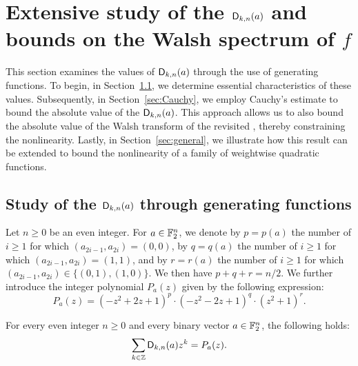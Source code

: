 \documentclass[11pt]{llncs}
\begin{document}
\section{Extensive study of the $\Dnka nka$ and bounds on the Walsh spectrum of $f$}\label{sec:dnk}

This section examines the values of $\Dnka nka$ through the use of generating functions. To begin, in Section~\ref{sec:genfunc}, we determine essential characteristics of these values. Subsequently, in Section~\ref{sec:Cauchy}, we employ Cauchy's estimate to bound the absolute value of the $\Dnka nka$. This approach allows us to also bound the absolute value of the Walsh transform of the revisited \hwbf{}, thereby constraining the nonlinearity. Lastly, in Section~\ref{sec:general}, we illustrate how this result can be extended to bound the nonlinearity of a family of weightwise quadratic functions.

\subsection{Study of the $\Dnka nka$ through generating functions}\label{sec:genfunc}

\begin{definition}\label{defi:P_a}
    Let $n\geq 0$ be an even integer. For $a\in\F_2^n$, we denote by $p=p(a)$ the number of $i\geq 1$ for which $(a_{2i-1},a_{2i})=(0,0)$, by $q=q(a)$ the number of $i\geq 1$ for which $(a_{2i-1},a_{2i})=(1,1)$, and by $r=r(a)$ the number of $i\geq 1$ for which $(a_{2i-1},a_{2i})\in\{(0,1),(1,0)\}$. We then have $p+q+r=n/2$. We further introduce the integer polynomial $P_a(z)$ given by the following expression:
    \[
    	P_a(z)=(-z^2+2z+1)^{p}\cdot(-z^2-2z+1)^{q}\cdot(z^2+1)^{r}.
    \]
\end{definition}

\begin{proposition}\label{proposition:generating_fct}
	For every even integer $n\geq 0$ and every binary vector $a\in\F_2^n$, the following holds:
    \[
        \sum_{k\in\Z}\Dnka nka z^k= P_a(z).
    \]
\end{proposition}
\end{document}
